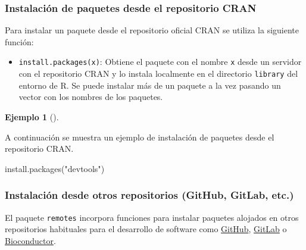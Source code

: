 \documentclass[
  a4paper,
]{scrreport}
\newenvironment{Shaded}{\begin{snugshade}}{\end{snugshade}}
\newcommand{\FunctionTok}[1]{\textcolor[rgb]{0.28,0.35,0.67}{#1}}
\newcommand{\NormalTok}[1]{\textcolor[rgb]{0.00,0.23,0.31}{#1}}
\newcommand{\StringTok}[1]{\textcolor[rgb]{0.13,0.47,0.30}{#1}}
\providecommand{\tightlist}{%
  \setlength{\itemsep}{0pt}\setlength{\parskip}{0pt}}\usepackage{longtable,booktabs,array}
\theoremstyle{definition}
\newtheorem{example}{Ejemplo}[chapter]
\theoremstyle{definition}
\theoremstyle{remark}
\begin{document}
\hypertarget{instalaciuxf3n-de-paquetes-desde-el-repositorio-cran}{%
\subsubsection{Instalación de paquetes desde el repositorio
CRAN}\label{instalaciuxf3n-de-paquetes-desde-el-repositorio-cran}}

Para instalar un paquete desde el repositorio oficial CRAN se utiliza la
siguiente función:

\begin{itemize}
\tightlist
\item
  \texttt{install.packages(x)}: Obtiene el paquete con el nombre
  \texttt{x} desde un servidor con el repositorio CRAN y lo instala
  localmente en el directorio \texttt{library} del entorno de R. Se
  puede instalar más de un paquete a la vez pasando un vector con los
  nombres de los paquetes.
\end{itemize}

\leavevmode{}%
\begin{example}[]\label{exm-instalacion-paquetes}

A continuación se muestra un ejemplo de instalación de paquetes desde el
repositorio CRAN.

\begin{Shaded}
\begin{Highlighting}[]
\FunctionTok{install.packages}\NormalTok{(}\StringTok{"devtools"}\NormalTok{)}
\end{Highlighting}
\end{Shaded}

\end{example}

\hypertarget{instalaciuxf3n-desde-otros-repositorios-github-gitlab-etc.}{%
\subsubsection{Instalación desde otros repositorios (GitHub, GitLab,
etc.)}\label{instalaciuxf3n-desde-otros-repositorios-github-gitlab-etc.}}

El paquete \texttt{remotes} incorpora funciones para instalar paquetes
alojados en otros repositorios habituales para el desarrollo de software
como \href{https://github.com/}{GitHub},
\href{httpsb://gitlab.com/}{GitLab} o
\href{https://www.bioconductor.org/}{Bioconductor}.
\end{document}
